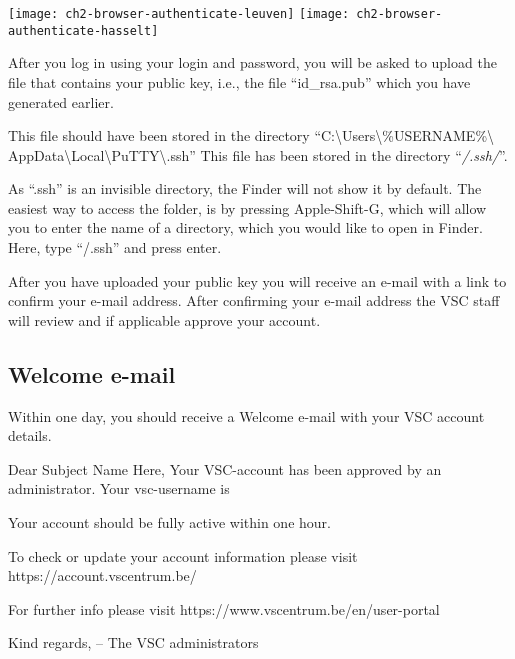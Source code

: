  \begin{center}
  \texttt{[image: ch2-browser-authenticate-leuven]}
  \texttt{[image: ch2-browser-authenticate-hasselt]}
  \end{center}

 
\fi


After you log in using your \university login and password,
you will be asked to upload the file that contains
your public key, i.e., the file ``id\_rsa.pub'' which you have
generated earlier.

\ifwindows
  This file should have been stored in the directory
  ``C:\textbackslash Users\textbackslash \%USERNAME\%\textbackslash
  AppData\textbackslash Local\textbackslash PuTTY\textbackslash .ssh''
\fi
\ifmacORlinux
  This file has been stored in the directory ``\emph{\tilde/.ssh/}''.
\fi

\ifmac
\begin{tip}
  As ``.ssh'' is an invisible directory, the Finder will
  not show it by default. The easiest way to access the folder, is by pressing
  Apple-Shift-G, which will allow you to enter the name of a directory, which
  you would like to open in Finder. Here, type ``\tilde/.ssh'' and press enter.
\end{tip}
\fi

After you have uploaded your public key you will receive an e-mail with a link to
confirm your e-mail address. After confirming your e-mail address the VSC staff will
review and if applicable approve your account.

\subsection{Welcome e-mail}
\label{sec:welcome-email}

Within one day, you should receive a Welcome e-mail with your VSC account details.

\begin{flattext}
Dear Subject Name Here,
Your VSC-account has been approved by an administrator.
Your vsc-username is %

Your account should be fully active within one hour.

To check or update your account information please visit
https://account.vscentrum.be/

For further info please visit https://www.vscentrum.be/en/user-portal

Kind regards,
-- The VSC administrators
\end{flattext}

